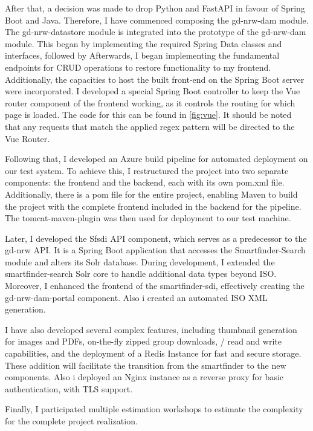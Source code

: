 \documentclass[11pt, titlepage, a4paper]{article}
\begin{document}
After that, a decision was made to drop Python and FastAPI in favour of Spring Boot and Java. Therefore, I have commenced composing the gd-nrw-dam module. The gd-nrw-datastore module is integrated into the prototype of the gd-nrw-dam module. This began by implementing the required Spring Data classes and interfaces, followed by Afterwards, I began implementing the fundamental endpoints for CRUD operations to restore functionality to my frontend. Additionally, the capacities to host the built front-end on the Spring Boot server were incorporated. I developed a special Spring Boot controller to keep the Vue router component of the frontend working, as it controls the routing for which page is loaded. The code for this can be found in \ref{fig:vue}. It should be noted that any requests that match the applied regex pattern will be directed to the Vue Router.

Following that, I developed an Azure build pipeline for automated deployment on our test system.  To achieve this, I restructured the project into two separate components: the frontend and the backend, each with its own pom.xml file. Additionally, there is a pom file for the entire project, enabling Maven to build the project with the complete frontend included in the backend for the pipeline. The tomcat-maven-plugin was then used for deployment to our test machine.

Later, I developed the Sfsdi API component, which serves as a predecessor to the gd-nrw API. It is a Spring Boot application that accesses the Smartfinder-Search module and alters its Solr database. During development, I extended the smartfinder-search Solr core to handle additional data types beyond ISO. Moreover, I enhanced the frontend of the smartfinder-sdi, effectively creating the gd-nrw-dam-portal component.
Also i created an automated ISO XML generation.

I have also developed several complex features, including thumbnail generation for images and PDFs, on-the-fly zipped group downloads, / read and write capabilities, and the deployment of a Redis Instance for fast and secure storage. These addition will facilitate the transition from the smartfinder to the new components. Also i deployed an Nginx instance as a reverse proxy for basic authentication, with TLS support.

Finally, I participated multiple estimation workshops to estimate the complexity for the complete project realization.
\end{document}
